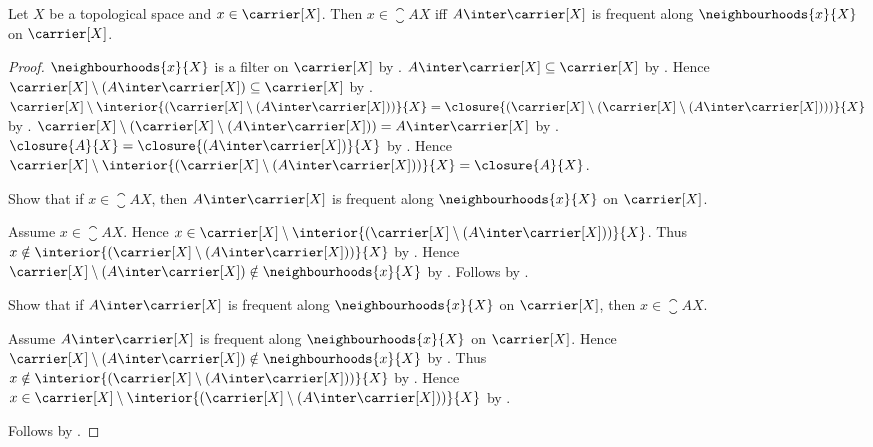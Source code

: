 \begin{theorem}\label{closure_iff_neighbourhood_frequent}
    Let $X$ be a topological space and $x\in\carrier[X]$.
    Then $x\in\closure{A}{X}$ iff
        $A\inter\carrier[X]$ is frequent along
        $\neighbourhoods{x}{X}$ on $\carrier[X]$.
\end{theorem}
\begin{proof}
    $\neighbourhoods{x}{X}$ is a filter on $\carrier[X]$ by
        .
    $A\inter\carrier[X]\subseteq\carrier[X]$ by
        .
    Hence $\carrier[X]\setminus(A\inter\carrier[X])
        \subseteq\carrier[X]$ by .
    $\carrier[X]\setminus
        \interior{(\carrier[X]\setminus(A\inter\carrier[X]))}{X}
        =\closure{(\carrier[X]\setminus
            (\carrier[X]\setminus(A\inter\carrier[X])))}{X}$ by
        .
    $\carrier[X]\setminus
        (\carrier[X]\setminus(A\inter\carrier[X]))
        =A\inter\carrier[X]$ by
        .
    $\closure{A}{X}=\closure{(A\inter\carrier[X])}{X}$ by
        .
    Hence
        $\carrier[X]\setminus
            \interior{(\carrier[X]\setminus
                (A\inter\carrier[X]))}{X}
            =\closure{A}{X}$.

    Show that if $x\in\closure{A}{X}$, then
        $A\inter\carrier[X]$ is frequent along
            $\neighbourhoods{x}{X}$ on $\carrier[X]$.
    \begin{subproof}
        Assume $x\in\closure{A}{X}$.
        Hence $x\in\carrier[X]\setminus
            \interior{(\carrier[X]\setminus
                (A\inter\carrier[X]))}{X}$.
        Thus $x\notin\interior{(\carrier[X]\setminus
            (A\inter\carrier[X]))}{X}$ by .
        Hence $\carrier[X]\setminus(A\inter\carrier[X])
            \notin\neighbourhoods{x}{X}$ by
            .
        Follows by .
    \end{subproof}

    Show that if $A\inter\carrier[X]$ is frequent along
        $\neighbourhoods{x}{X}$ on $\carrier[X]$,
        then $x\in\closure{A}{X}$.
    \begin{subproof}
        Assume $A\inter\carrier[X]$ is frequent along
            $\neighbourhoods{x}{X}$ on $\carrier[X]$.
        Hence $\carrier[X]\setminus(A\inter\carrier[X])
            \notin\neighbourhoods{x}{X}$ by
            .
        Thus $x\notin\interior{(\carrier[X]\setminus
            (A\inter\carrier[X]))}{X}$ by
            .
        Hence $x\in\carrier[X]\setminus
            \interior{(\carrier[X]\setminus
                (A\inter\carrier[X]))}{X}$ by
            .
    \end{subproof}
    Follows by \auto.
\end{proof}

